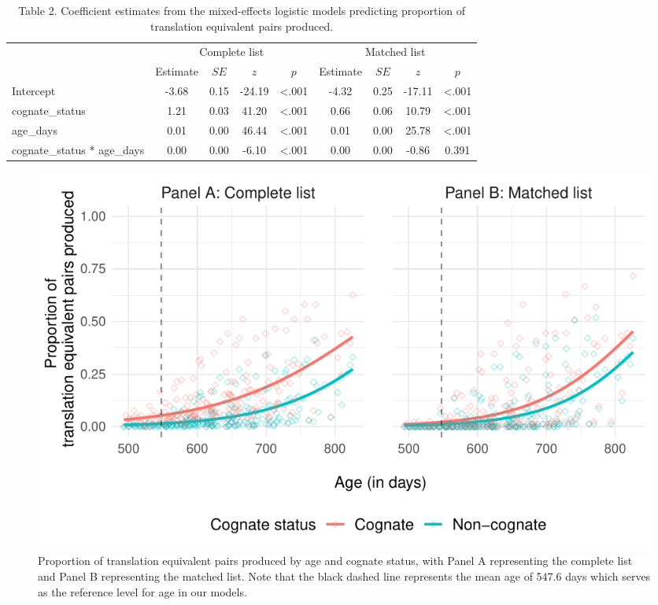 \documentclass[
  ,man,floatsintext]{apa6}
\begin{document}
\begin{table}[H]

\begin{center}
\begin{threeparttable}

\caption{\label{tab:Table 2}Table 2. Coefficient estimates from the mixed-effects logistic models predicting proportion of translation equivalent pairs produced.}

\begin{tabular}{lcccccccc}
\toprule
 & \multicolumn{4}{c}{Complete list} & \multicolumn{4}{c}{Matched list} \\
\cmidrule(r){2-5} \cmidrule(r){6-9}
 & Estimate & $SE$ & $z$ & $p$ & Estimate & $SE$ & $z$ & $p$\\
\midrule
Intercept & -3.68 & 0.15 & -24.19 & <.001 & -4.32 & 0.25 & -17.11 & <.001\\
cognate\_status & 1.21 & 0.03 & 41.20 & <.001 & 0.66 & 0.06 & 10.79 & <.001\\
age\_days & 0.01 & 0.00 & 46.44 & <.001 & 0.01 & 0.00 & 25.78 & <.001\\
cognate\_status * age\_days & 0.00 & 0.00 & -6.10 & <.001 & 0.00 & 0.00 & -0.86 & 0.391\\
\bottomrule
\end{tabular}

\end{threeparttable}
\end{center}

\end{table}

\begin{figure}

{\centering \includegraphics[width=1.2\linewidth]{CogVocab_paper_files/figure-latex/Fig2-1} 

}

\caption{Proportion of translation equivalent pairs produced by age and cognate status, with Panel A representing the complete list and Panel B representing the matched list. Note that the black dashed line represents the mean age of 547.6 days which serves as the reference level for age in our models.}\label{fig:Fig2}
\end{figure}
\end{document}

